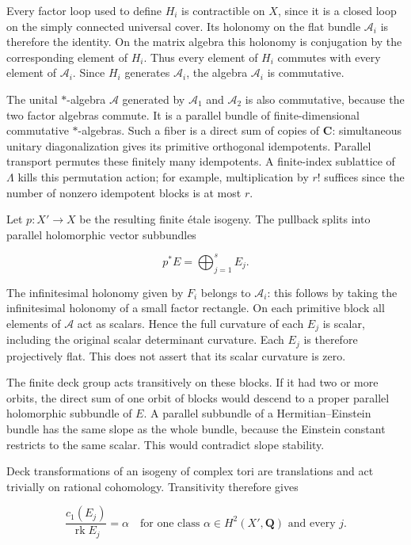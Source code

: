 Every factor loop used to define \(H_i\) is contractible on \(X\), since
it is a closed loop on the simply connected universal cover. Its
holonomy on the flat bundle \(\mathscr A_i\) is therefore the identity.
On the matrix algebra this holonomy is conjugation by the corresponding
element of \(H_i\). Thus every element of \(H_i\) commutes with every
element of \(\mathscr A_i\). Since \(H_i\) generates \(\mathscr A_i\),
the algebra \(\mathscr A_i\) is commutative.

The unital \(*\)-algebra \(\mathscr A\) generated by \(\mathscr A_1\)
and \(\mathscr A_2\) is also commutative, because the two factor
algebras commute. It is a parallel bundle of finite-dimensional
commutative \(*\)-algebras. Such a fiber is a direct sum of copies of
\(\mathbf C\): simultaneous unitary diagonalization gives its primitive
orthogonal idempotents. Parallel transport permutes these finitely many
idempotents. A finite-index sublattice of \(\Lambda\) kills this
permutation action; for example, multiplication by \(r!\) suffices since
the number of nonzero idempotent blocks is at most \(r\).

Let \(p:X'\to X\) be the resulting finite étale isogeny. The pullback
splits into parallel holomorphic vector subbundles

\[
 p^*E=\bigoplus_{j=1}^s E_j.
 \tag{E811.11}
\]

The infinitesimal holonomy given by \(F_i\) belongs to \(\mathscr A_i\):
this follows by taking the infinitesimal holonomy of a small factor
rectangle. On each primitive block all elements of \(\mathscr A\) act as
scalars. Hence the full curvature of each \(E_j\) is scalar, including
the original scalar determinant curvature. Each \(E_j\) is therefore
projectively flat. This does not assert that its scalar curvature is
zero.

The finite deck group acts transitively on these blocks. If it had two
or more orbits, the direct sum of one orbit of blocks would descend to a
proper parallel holomorphic subbundle of \(E\). A parallel subbundle of
a Hermitian--Einstein bundle has the same slope as the whole bundle,
because the Einstein constant restricts to the same scalar. This would
contradict slope stability.

Deck transformations of an isogeny of complex tori are translations and
act trivially on rational cohomology. Transitivity therefore gives

\[
 \frac{c_1(E_j)}{\operatorname{rk}E_j}=\alpha
      \quad\text{for one class }\alpha\in H^2(X',\mathbf Q)
      \text{ and every }j.
 \tag{E811.12}
\]

